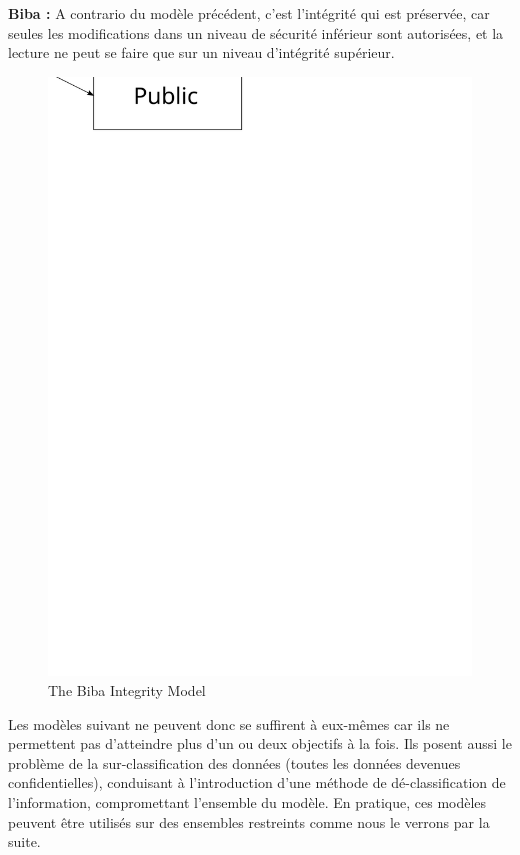 \documentclass[pdftex,a4paper,titlepage,11pt]{article}
\begin{document}
\bigskip

\textbf{Biba :} A contrario du modèle précédent, c'est l'intégrité qui est préservée, car seules les modifications dans un niveau de sécurité inférieur sont autorisées, et la lecture ne peut se faire que sur un niveau d'intégrité supérieur.

\begin{figure}[h]
	\centering
	\includegraphics[scale=0.5]{biba}
	\caption{The Biba Integrity Model}
\end{figure}

\bigskip

Les modèles suivant ne peuvent donc se suffirent à eux-mêmes car ils ne permettent pas d'atteindre plus d'un ou deux objectifs à la fois. Ils posent aussi le problème de la sur-classification des données (toutes les données devenues confidentielles), conduisant à l'introduction d'une méthode de dé-classification de l'information, compromettant l'ensemble du modèle.
En pratique, ces modèles peuvent être utilisés sur des ensembles restreints comme nous le verrons par la suite.
\end{document}
